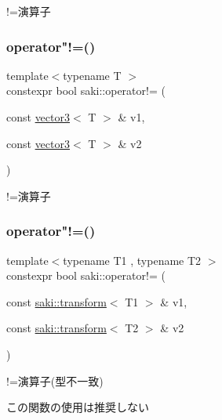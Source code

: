 !=演算子 

\mbox{\label{namespacesaki_aa8b0dcab7f268e88f01c92c95cd12135}} 
\subsubsection{\texorpdfstring{operator"!=()}{operator!=()}\hspace{0.1cm}{\footnotesize\ttfamily [4/14]}}
{\footnotesize\ttfamily template$<$typename T $>$ \\
constexpr bool saki\+::operator!= (\begin{DoxyParamCaption}\item[{const \mbox{\hyperlink{classsaki_1_1vector3}{vector3}}$<$ T $>$ \&}]{v1,  }\item[{const \mbox{\hyperlink{classsaki_1_1vector3}{vector3}}$<$ T $>$ \&}]{v2 }\end{DoxyParamCaption})}



!=演算子 

\mbox{\label{namespacesaki_a8c33f5cbcafab48779b77c324716fed9}} 
\subsubsection{\texorpdfstring{operator"!=()}{operator!=()}\hspace{0.1cm}{\footnotesize\ttfamily [5/14]}}
{\footnotesize\ttfamily template$<$typename T1 , typename T2 $>$ \\
constexpr bool saki\+::operator!= (\begin{DoxyParamCaption}\item[{const \mbox{\hyperlink{classsaki_1_1transform}{saki\+::transform}}$<$ T1 $>$ \&}]{v1,  }\item[{const \mbox{\hyperlink{classsaki_1_1transform}{saki\+::transform}}$<$ T2 $>$ \&}]{v2 }\end{DoxyParamCaption})}



!=演算子(型不一致) 

この関数の使用は推奨しない \mbox{\label{namespacesaki_ac0c806d3237b6718e95e9b71f838bcc1}} 
